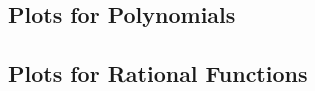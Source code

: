 \documentclass[12pt]{article}
\begin{document}

\subsection{Plots for Polynomials}

\subsection{Plots for Rational Functions}


\end{document}
